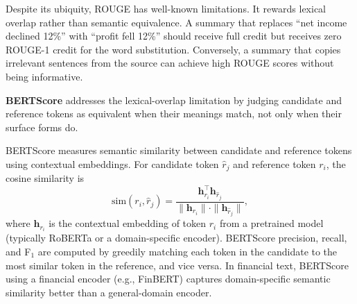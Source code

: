 Despite its ubiquity, ROUGE has well-known limitations. It rewards lexical overlap rather
than semantic equivalence. A summary that replaces ``net income declined 12\%'' with
``profit fell 12\%'' should receive full credit but receives zero ROUGE-1 credit for the
word substitution. Conversely, a summary that copies irrelevant sentences from the source
can achieve high ROUGE scores without being informative.

\begin{context}
\textbf{BERTScore} \citep{zhang2020bertscore} addresses the lexical-overlap limitation
by judging candidate and reference tokens as equivalent when their meanings match, not
only when their surface forms do.
\end{context}

\begin{deepdive}
BERTScore measures semantic similarity between candidate and reference tokens using
contextual embeddings. For candidate token $\hat{r}_j$ and reference token $r_i$, the cosine
similarity is
\begin{equation}
\label{eq:bertscore}
\text{sim}(r_i, \hat{r}_j) = \frac{\mathbf{h}_{r_i}^\top \mathbf{h}_{\hat{r}_j}}
  {\|\mathbf{h}_{r_i}\| \cdot \|\mathbf{h}_{\hat{r}_j}\|},
\end{equation}
where $\mathbf{h}_{r_i}$ is the contextual embedding of token $r_i$ from a pretrained
model (typically RoBERTa or a domain-specific encoder). BERTScore precision, recall, and
F$_1$ are computed by greedily matching each token in the candidate to the most similar
token in the reference, and vice versa. In financial text, BERTScore using a financial
encoder (e.g., FinBERT) captures domain-specific semantic similarity better than a
general-domain encoder.
\end{deepdive}

